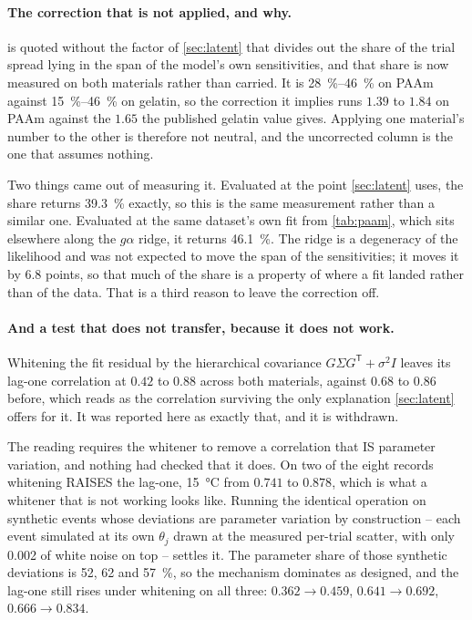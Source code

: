 \documentclass[10pt]{article}
\begin{document}
\paragraph{The correction that is not applied, and why.}  is quoted without the
factor of \cref{sec:latent} that divides out the share of the trial spread lying in the span of
the model's own sensitivities, and that share is now measured on both materials rather than
carried. It is \SIrange{28}{46}{\percent} on PAAm against \SIrange{15}{46}{\percent} on gelatin,
so the correction it implies runs $1.39$ to $1.84$ on PAAm against the $1.65$ the published
gelatin value gives. Applying one material's number to the other is therefore not neutral, and
the uncorrected column is the one that assumes nothing.

Two things came out of measuring it. Evaluated at the point \cref{sec:latent} uses, the share
returns \SI{39.3}{\percent} exactly, so this is the same measurement rather than a similar one.
Evaluated at the same dataset's own fit from \cref{tab:paam}, which sits elsewhere along the
$g\alpha$ ridge, it returns \SI{46.1}{\percent}. The ridge is a degeneracy of the likelihood
and was not expected to move the span of the sensitivities; it moves it by $6.8$ points, so that
much of the share is a property of where a fit landed rather than of the data. That is a third
reason to leave the correction off.

\paragraph{And a test that does not transfer, because it does not work.} Whitening the fit
residual by the hierarchical covariance $G \Sigma G^{\mathsf T} + \sigma^2 I$ leaves its lag-one
correlation at $0.42$ to $0.88$ across both materials, against $0.68$ to $0.86$ before, which
reads as the correlation surviving the only explanation \cref{sec:latent} offers for it. It was
reported here as exactly that, and it is withdrawn.

The reading requires the whitener to remove a correlation that IS parameter variation, and
nothing had checked that it does. On two of the eight records whitening RAISES the lag-one,
\SI{15}{\celsius} from $0.741$ to $0.878$, which is what a whitener that is not working looks
like. Running the identical operation on synthetic events whose deviations are parameter
variation by construction -- each event simulated at its own $\theta_j$ drawn at the measured
per-trial scatter, with only \num{0.002} of white noise on top -- settles it. The parameter
share of those synthetic deviations is \SI{52}{}, \SI{62}{} and \SI{57}{\percent}, so the
mechanism dominates as designed, and the lag-one still rises under whitening on all three:
$0.362 \to 0.459$, $0.641 \to 0.692$, $0.666 \to 0.834$.
\end{document}

